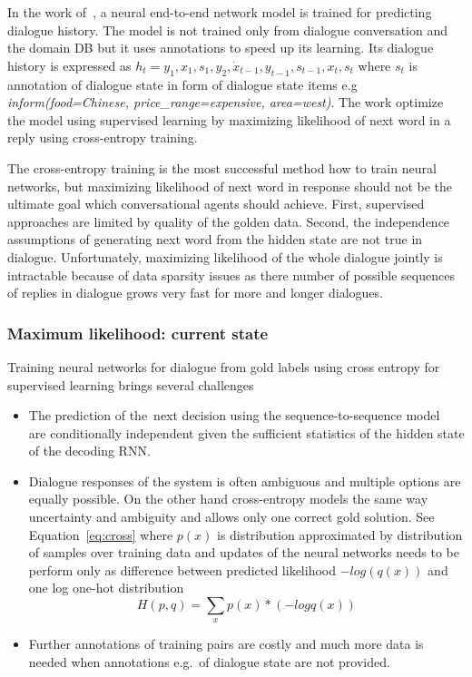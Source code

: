 \documentclass[11pt]{article}
\begin{document}
In the work of~\cite{wen_networkbased_2016}, a neural end-to-end network model is trained for predicting dialogue history.
The model is not trained only from dialogue conversation and the domain DB but it uses annotations to speed up its learning.
Its dialogue history is expressed as $h_t = y_1, x_1, s_1, y_2, \dot x_{t-1}, y_{t-1}, s_{t-1}, x_t, s_t $ where $s_t$ is annotation of dialogue state in form of dialogue state items e.g {\it inform(food=Chinese, price\_range=expensive, area=west)}.
The work optimize the model using supervised learning by maximizing likelihood of next word in a reply using cross-entropy training.

The cross-entropy training is the most successful method how to train neural networks, but maximizing likelihood of next word in response should not be the ultimate goal which conversational agents should achieve.
First, supervised approaches are limited by quality of the golden data.
Second, the independence assumptions of generating next word from the hidden state are not true in dialogue.
Unfortunately, maximizing likelihood of the whole dialogue jointly is intractable because of data sparsity issues as there number of possible sequences of replies in dialogue grows very fast for more and longer dialogues.


\subsubsection*{Maximum likelihood: current state}\label{sub:maximum_likelihood}
Training neural networks for dialogue from gold labels using cross entropy for supervised learning brings several challenges
\begin{itemize}
    \item The prediction of the~next decision using the sequence-to-sequence model~\cite{bahdanau_neural_2014,sutskever_sequence_2014} are conditionally independent given the sufficient statistics of the hidden state of the decoding RNN.
    \item Dialogue responses of the system is often ambiguous and multiple options are equally possible.
        On the other hand cross-entropy models the same way uncertainty and ambiguity and allows only one correct gold solution.
        See Equation~\ref{eq:cross} where $p(x)$ is distribution approximated by distribution of samples over training data and updates of the neural networks needs to be perform only as difference between predicted likelihood $-log(q(x))$ and one log one-hot distribution
        \begin{equation}\label{eq:cross}
            H(p, q) = \sum_{x}{p(x) * (- log q(x))}     
        \end{equation}
    \item Further annotations of training pairs are costly and much more data is needed when annotations e.g.\ of dialogue state are not provided.
\end{itemize}
\end{document}
